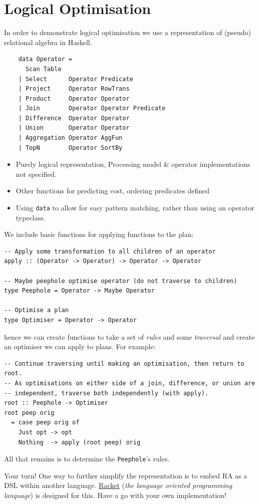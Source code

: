 \section{Logical Optimisation}
In order to demonstrate logical optimisation we use a representation of 
(pseudo) relational algebra in Haskell.
\begin{center}
\begin{minipage}{.5\textwidth}
    \begin{verbatim}
    data Operator = 
      Scan Table
    | Select      Operator Predicate
    | Project     Operator RowTrans
    | Product     Operator Operator
    | Join        Operator Operator Predicate
    | Difference  Operator Operator
    | Union       Operator Operator
    | Aggregation Operator AggFun
    | TopN        Operator SortBy
    \end{verbatim} 
\end{minipage} \hfill \begin{minipage}{.49\textwidth}
    \begin{itemize}
        \item Purely logical representation, Processing model \& operator implementations not specified.
        \item Other functions for predicting cost, ordering predicates defined
        \item Using \texttt{data} to allow for easy pattern matching, rather than using an operator typeclass.
    \end{itemize}
\end{minipage}
\end{center}
We include basic functions for applying functions to the plan:
\begin{verbatim}
-- Apply some transformation to all children of an operator
apply :: (Operator -> Operator) -> Operator -> Operator

-- Maybe peephole optimise operator (do not traverse to children)
type Peephole = Operator -> Maybe Operator

-- Optimise a plan 
type Optimiser = Operator -> Operator
\end{verbatim}
hence we can create functions to take a set of \textit{rules} and some \textit{traversal} and create an optimiser we can apply to plans. For example:
\begin{verbatim}
-- Continue traversing until making an optimisation, then return to root.
-- As optimisations on either side of a join, difference, or union are 
-- independent, traverse both independently (with apply).
root :: Peephole -> Optimiser
root peep orig 
  = case peep orig of
    Just opt -> opt
    Nothing  -> apply (root peep) orig
\end{verbatim} 
All that remains is to determine the \texttt{Peephole}'s rules.
\begin{sidenotebox}{Your turn!}
    One way to further simplify the representation is to embed RA as a DSL within another language. \href{https://racket-lang.org/}{Racket} (\textit{the language oriented programming language}) is designed for this. Have a go with your own implementation!
\end{sidenotebox}
